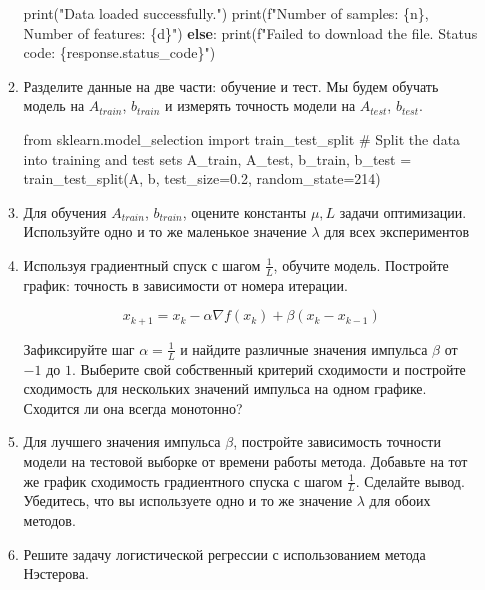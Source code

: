 \documentclass[
  russian,
  letterpaper,
  DIV=11,
  numbers=noendperiod]{scrartcl}
\newenvironment{Shaded}{\begin{snugshade}}{\end{snugshade}}
\newcommand{\BuiltInTok}[1]{\textcolor[rgb]{0.00,0.23,0.31}{#1}}
\newcommand{\CommentTok}[1]{\textcolor[rgb]{0.37,0.37,0.37}{#1}}
\newcommand{\ControlFlowTok}[1]{\textcolor[rgb]{0.00,0.23,0.31}{\textbf{#1}}}
\newcommand{\DecValTok}[1]{\textcolor[rgb]{0.68,0.00,0.00}{#1}}
\newcommand{\FloatTok}[1]{\textcolor[rgb]{0.68,0.00,0.00}{#1}}
\newcommand{\ImportTok}[1]{\textcolor[rgb]{0.00,0.46,0.62}{#1}}
\newcommand{\NormalTok}[1]{\textcolor[rgb]{0.00,0.23,0.31}{#1}}
\newcommand{\OperatorTok}[1]{\textcolor[rgb]{0.37,0.37,0.37}{#1}}
\newcommand{\SpecialCharTok}[1]{\textcolor[rgb]{0.37,0.37,0.37}{#1}}
\newcommand{\SpecialStringTok}[1]{\textcolor[rgb]{0.13,0.47,0.30}{#1}}
\newcommand{\StringTok}[1]{\textcolor[rgb]{0.13,0.47,0.30}{#1}}
\begin{document}
\begin{enumerate}
\begin{enumerate}
\begin{Shaded}
\begin{Highlighting}[]
    \BuiltInTok{print}\NormalTok{(}\StringTok{"Data loaded successfully."}\NormalTok{)}
    \BuiltInTok{print}\NormalTok{(}\SpecialStringTok{f"Number of samples: }\SpecialCharTok{\{}\NormalTok{n}\SpecialCharTok{\}}\SpecialStringTok{, Number of features: }\SpecialCharTok{\{}\NormalTok{d}\SpecialCharTok{\}}\SpecialStringTok{"}\NormalTok{)}
\ControlFlowTok{else}\NormalTok{:}
    \BuiltInTok{print}\NormalTok{(}\SpecialStringTok{f"Failed to download the file. Status code: }\SpecialCharTok{\{}\NormalTok{response}\SpecialCharTok{.}\NormalTok{status\_code}\SpecialCharTok{\}}\SpecialStringTok{"}\NormalTok{)}
\end{Highlighting}
\end{Shaded}
  \item
    Разделите данные на две части: обучение и тест. Мы будем обучать
    модель на \(A_{train}\), \(b_{train}\) и измерять точность модели на
    \(A_{test}\), \(b_{test}\).

\begin{Shaded}
\begin{Highlighting}[]
\ImportTok{from}\NormalTok{ sklearn.model\_selection }\ImportTok{import}\NormalTok{ train\_test\_split}
\CommentTok{\# Split the data into training and test sets}
\NormalTok{A\_train, A\_test, b\_train, b\_test }\OperatorTok{=}\NormalTok{ train\_test\_split(A, b, test\_size}\OperatorTok{=}\FloatTok{0.2}\NormalTok{, random\_state}\OperatorTok{=}\DecValTok{214}\NormalTok{)}
\end{Highlighting}
\end{Shaded}
  \item
    Для обучения \(A_{train}\), \(b_{train}\), оцените константы
    \(\mu, L\) задачи оптимизации. Используйте одно и то же маленькое
    значение \(\lambda\) для всех экспериментов
  \item
    Используя градиентный спуск с шагом \(\frac{1}{L}\), обучите модель.
    Постройте график: точность в зависимости от номера итерации.

    \[
     \tag{HB}
     x_{k+1} = x_k - \alpha \nabla f(x_k) + \beta (x_k - x_{k-1})
     \]

    Зафиксируйте шаг \(\alpha = \frac{1}{L}\) и найдите различные
    значения импульса \(\beta\) от \(-1\) до \(1\). Выберите свой
    собственный критерий сходимости и постройте сходимость для
    нескольких значений импульса на одном графике. Сходится ли она
    всегда монотонно?
  \item
    Для лучшего значения импульса \(\beta\), постройте зависимость
    точности модели на тестовой выборке от времени работы метода.
    Добавьте на тот же график сходимость градиентного спуска с шагом
    \(\frac{1}{L}\). Сделайте вывод. Убедитесь, что вы используете одно
    и то же значение \(\lambda\) для обоих методов.
  \item
    Решите задачу логистической регрессии с использованием метода
    Нэстерова.


\end{enumerate}
\end{enumerate}
\end{document}
